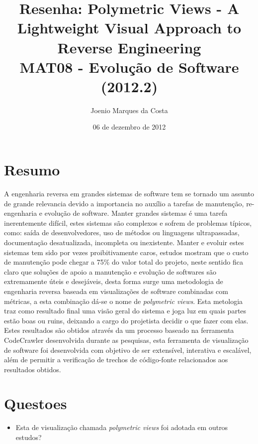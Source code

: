 \documentclass[12pt]{article}
\title{Resenha: Polymetric Views - A Lightweight Visual Approach to Reverse Engineering\cite{PolymetricViews} \\
 \large MAT08 - Evolução de Software (2012.2)}
\author{Joenio Marques da Costa}
\date{06 de dezembro de 2012}
\begin{document}
\maketitle

\section{Resumo}

A engenharia reversa em grandes sistemas de software tem se tornado um assunto
de grande relevancia devido a importancia no auxílio a tarefas de manutenção,
re-engenharia e evolução de software. Manter grandes sistemas é uma tarefa
inerentemente difícil, estes sistemas são complexos e sofrem de problemas
típicos, como: saída de desenvolvedores, uso de métodos ou linguagens
ultrapassadas, documentação desatualizada, incompleta ou inexistente. Manter e
evoluir estes sistemas tem sido por vezes proibitivamente caros, estudos
mostram que o custo de manutenção pode chegar a 75\% do valor total do projeto,
neste sentido fica claro que soluções de apoio a manutenção e evolução de
softwares são extremamente úteis e desejáveis, desta forma surge uma
metodologia de engenharia reversa baseada em visualizações de software
combinadas com métricas, a esta combinação dá-se o nome de {\it polymetric
views}. Esta metologia traz como resultado final uma visão geral do sistema e
joga luz em quais partes estão boas ou ruins, deixando a cargo do projetista
decidir o que fazer com elas. Estes resultados são obtidos através da um
processo baseado na ferramenta CodeCrawler desenvolvida durante as pesquisas,
esta ferramenta de visualização de software foi desenvolvida com objetivo de
ser extensível, interativa e escalável, além de permitir a verificação de
trechos de código-fonte relacionados aos resultados obtidos.

\section{Questoes}

\begin{itemize}
  \item Esta de visualização chamada {\it polymetric views} foi adotada em outros estudos?
\end{itemize}


\end{document}
